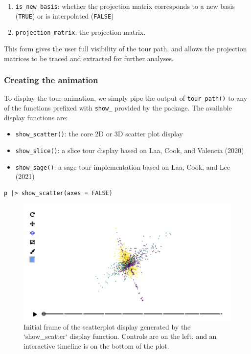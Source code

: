 \begin{enumerate}
\def\labelenumi{\arabic{enumi}.}
\tightlist
\item
  \texttt{is\_new\_basis}: whether the projection matrix corresponds to a new basis (\texttt{TRUE}) or is interpolated (\texttt{FALSE})
\item
  \texttt{projection\_matrix}: the projection matrix.
\end{enumerate}

This form gives the user full visibility of the tour path, and allows the projection matrices to be traced and extracted for further analyses.

\hypertarget{creating-the-animation}{%
\subsubsection{Creating the animation}\label{creating-the-animation}}

To display the tour animation, we simply pipe the output of \texttt{tour\_path()} to any of the functions prefixed with \texttt{show\_} provided by the  package. The available display functions are:

\begin{itemize}
\tightlist
\item
  \texttt{show\_scatter()}: the core 2D or 3D scatter plot display
\item
  \texttt{show\_slice()}: a slice tour display based on Laa, Cook, and Valencia (2020)
\item
  \texttt{show\_sage()}: a sage tour implementation based on Laa, Cook, and Lee (2021)
\end{itemize}

\begin{verbatim}
p |> show_scatter(axes = FALSE)
\end{verbatim}

\begin{figure}
\includegraphics[width=\textwidth]{figures/implementation/pdfsense_scatter_3d} \caption{Initial frame of the scatterplot display generated by the `show\_scatter` display function. Controls are on the left, and an interactive timeline is on the bottom of the plot.}\label{fig:scatter-display-static}
\end{figure}

